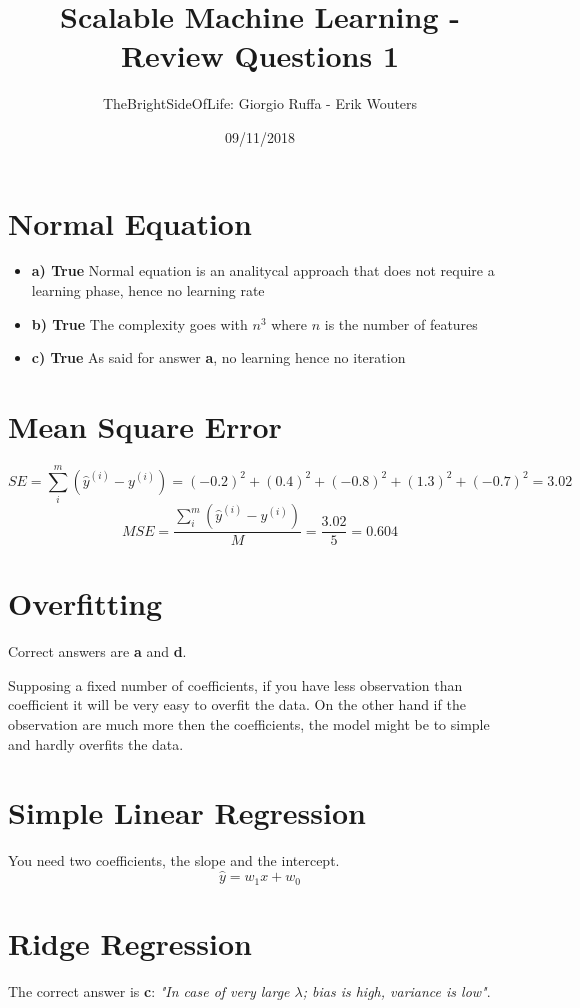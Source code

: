 \documentclass[a4paper]{article}
\title{Scalable Machine Learning - Review Questions 1}
\author{TheBrightSideOfLife: Giorgio Ruffa - Erik Wouters}
\date{09/11/2018}
\begin{document}
\maketitle

\section{Normal Equation}
\begin{itemize}
    \item \textbf{a) True} Normal equation is an analitycal approach that does not require a learning phase, hence no learning rate
    \item \textbf{b) True} The complexity goes with $n^3$ where $n$ is the number of features
    \item \textbf{c) True} As said for answer \textbf{a}, no learning hence no iteration
\end{itemize}

\section{Mean Square Error}
$$SE=\sum_{i}^{m} (\hat{y}^{(i)} - y^{(i)}) = (-0.2)^2 + (0.4)^2 + (-0.8)^2 + (1.3)^2 + (-0.7)^2 = 3.02$$ 
$$MSE=\frac{\sum_{i}^{m} (\hat{y}^{(i)} - y^{(i)})}{M} = \frac{3.02}{5} = 0.604$$

\section{Overfitting}
Correct answers are \textbf{a} and \textbf{d}.

Supposing a fixed number of coefficients, if you have less observation than coefficient it will be very easy to overfit the data. On the other hand if the observation are much more then the coefficients, the model might be to simple and hardly overfits the data.

\section{Simple Linear Regression}
You need two coefficients, the slope and the intercept.
$$\hat{y} = w_1 x + w_0$$

\section{Ridge Regression}
The correct answer is \textbf{c}: \textit{"In case of very large $\lambda$; bias is high, variance is low"}.
\end{document}
